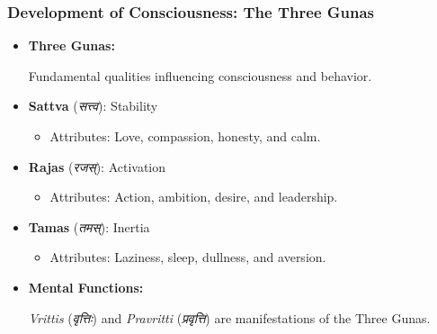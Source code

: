 \begin{frame}[fragile]\frametitle{Development of Consciousness: The Three Gunas}

      \begin{itemize}
        \item \textbf{Three Gunas:}
        
        Fundamental qualities influencing consciousness and behavior.
        
        \item \textbf{Sattva} (\textit{सत्त्व}): Stability
        \begin{itemize}
            \item Attributes: Love, compassion, honesty, and calm.
        \end{itemize}
        \item \textbf{Rajas} (\textit{रजस्}): Activation
        \begin{itemize}
            \item Attributes: Action, ambition, desire, and leadership.
        \end{itemize}
        \item \textbf{Tamas} (\textit{तमस्}): Inertia
        \begin{itemize}
            \item Attributes: Laziness, sleep, dullness, and aversion.
        \end{itemize}
        \item \textbf{Mental Functions:}
        
        \textit{Vrittis} (\textit{वृत्तिः}) and \textit{Pravritti} (\textit{प्रवृत्ति}) are manifestations of the Three Gunas.
        
      \end{itemize}

\end{frame}

